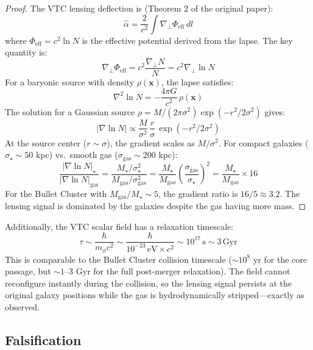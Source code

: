 \documentclass[11pt,a4paper]{article}
\theoremstyle{definition}
\newcommand{\eff}{\mathrm{eff}}
\newcommand{\gas}{\mathrm{gas}}
\begin{document}
\begin{proof}
The VTC lensing deflection is (Theorem 2 of the original paper):
\begin{equation}
\hat{\alpha} = \frac{2}{c^2}\int \nabla_\perp \Phi_\eff\,dl
\end{equation}
where $\Phi_\eff = c^2 \ln N$ is the effective potential derived from the lapse. The key quantity is:
\begin{equation}
\nabla_\perp \Phi_\eff = c^2 \frac{\nabla_\perp N}{N} = c^2 \nabla_\perp \ln N
\end{equation}
For a baryonic source with density $\rho(\mathbf{x})$, the lapse satisfies:
\begin{equation}
\nabla^2 \ln N = -\frac{4\pi G}{c^2}\,\rho(\mathbf{x})
\end{equation}
The solution for a Gaussian source $\rho = M/(2\pi\sigma^2)\exp(-r^2/2\sigma^2)$ gives:
\begin{equation}
|\nabla \ln N| \propto \frac{M}{\sigma^2}\,\frac{r}{\sigma}\,\exp(-r^2/2\sigma^2)
\end{equation}
At the source center ($r \sim \sigma$), the gradient scales as $M/\sigma^2$. For compact galaxies ($\sigma_\star \sim 50$ kpc) vs.\ smooth gas ($\sigma_\gas \sim 200$ kpc):
\begin{equation}
\frac{|\nabla \ln N|_\star}{|\nabla \ln N|_\gas} = \frac{M_\star/\sigma_\star^2}{M_\gas/\sigma_\gas^2} = \frac{M_\star}{M_\gas}\left(\frac{\sigma_\gas}{\sigma_\star}\right)^2 = \frac{M_\star}{M_\gas}\times 16
\end{equation}
For the Bullet Cluster with $M_\gas/M_\star \sim 5$, the gradient ratio is $16/5 \approx 3.2$. The lensing signal is dominated by the galaxies despite the gas having more mass.
\end{proof}

Additionally, the VTC scalar field has a relaxation timescale:
\begin{equation}
\tau \sim \frac{\hbar}{m_\phi c^2} \sim \frac{\hbar}{10^{-23}\,\mathrm{eV} \times c^2} \sim 10^{17}\,\mathrm{s} \sim 3\,\mathrm{Gyr}
\end{equation}
This is comparable to the Bullet Cluster collision timescale ($\sim 10^8$ yr for the core passage, but $\sim 1$--$3$ Gyr for the full post-merger relaxation). The field cannot reconfigure instantly during the collision, so the lensing signal persists at the original galaxy positions while the gas is hydrodynamically stripped---exactly as observed.

\subsection{Falsification}
\end{document}
